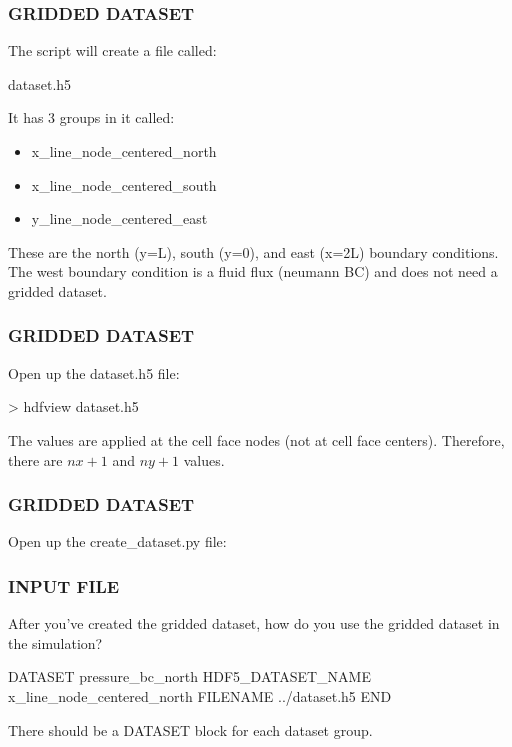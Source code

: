 \documentclass{beamer}
\begin{document}
\begin{frame}\frametitle{GRIDDED DATASET}

The script will create a file called:

\begin{semiverbatim}
dataset.h5
\end{semiverbatim}

It has 3 groups in it called:
\begin{itemize}
  \item x\_line\_node\_centered\_north
  \item x\_line\_node\_centered\_south
  \item y\_line\_node\_centered\_east
\end{itemize}

These are the north (y=L), south (y=0), and east (x=2L) boundary conditions.
The west boundary condition is a fluid flux (neumann BC) and does not need a
gridded dataset.
\end{frame}

\begin{frame}\frametitle{GRIDDED DATASET}

Open up the dataset.h5 file:

\begin{semiverbatim}
> hdfview dataset.h5
\end{semiverbatim}

The values are applied at the cell face nodes (not at cell face centers).
Therefore, there are $nx + 1$ and $ny + 1$ values.

\end{frame}

\begin{frame}\frametitle{GRIDDED DATASET}

Open up the create\_dataset.py file:

\end{frame}

\begin{frame}\frametitle{INPUT FILE}

After you've created the gridded dataset,
how do you use the gridded dataset in the simulation? 

\begin{semiverbatim}
DATASET pressure_bc_north
  HDF5_DATASET_NAME x_line_node_centered_north
  FILENAME ../dataset.h5
END
\end{semiverbatim}

There should be a DATASET block for each dataset group.

\end{frame}
\end{document}
